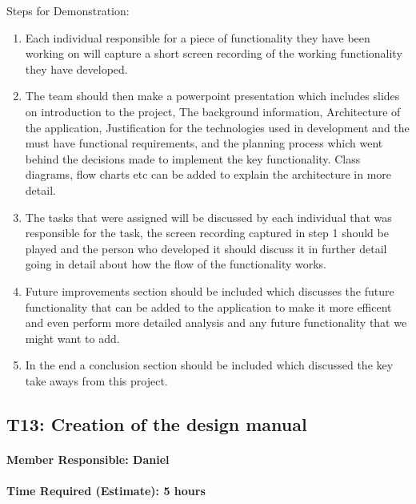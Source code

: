 \documentclass[
  paper=a4,
  ,captions=tableheading
]{scrartcl}
\begin{document}
Steps for Demonstration:
\begin{enumerate}
	\item Each individual responsible for a piece of functionality they have been working on will capture a short screen recording of the working functionality they have developed.
	\item The team should then make a powerpoint presentation which includes slides on introduction to the project, The background information, Architecture of the application, Justification for the technologies used in development and the must have functional requirements, and the planning process which went behind the decisions made to implement the key functionality.  Class diagrams, flow charts etc can be added to explain the architecture in more detail.
	\item The tasks that were assigned will be discussed by each individual that was responsible for the task, the screen recording captured in step 1 should be played and the person who developed it should discuss it in further detail going in detail about how the flow of the functionality works.
	\item Future improvements section should be included which discusses the future functionality that can be added to the application to make it more efficent and even perform more detailed analysis and any future functionality that we might want to add.
	\item In the end a conclusion section should be included which discussed the key take aways from this project.
\end{enumerate}

\newpage
\hypertarget{t13-creation-of-the-design-manual}{%
\subsection{T13: Creation of the design
manual}\label{t13-creation-of-the-design-manual}}

\hypertarget{member-responsible-daniel-1}{%
\paragraph{Member Responsible:
Daniel}\label{member-responsible-daniel-1}}

\hypertarget{time-required-estimate-5-hours-1}{%
\paragraph{Time Required (Estimate): 5
hours}\label{time-required-estimate-5-hours-1}}
\end{document}
